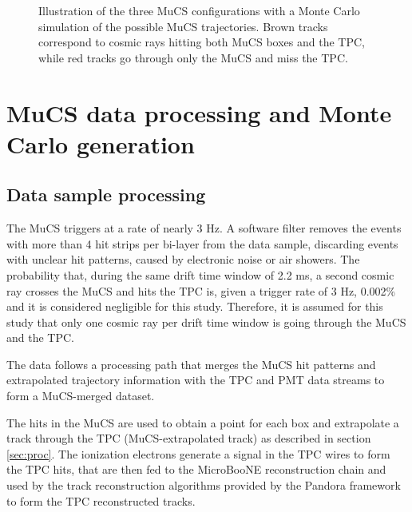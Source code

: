 \documentclass[a4paper,11pt]{article}
\begin{document}
\begin{figure}[htbp]
  \caption{Illustration of the three MuCS configurations with a Monte Carlo simulation of the possible MuCS trajectories. Brown tracks correspond to cosmic rays hitting both MuCS boxes and the TPC, while red tracks go through only the MuCS and miss the TPC.} \label{fig:mucs}
\end{figure}


\section{MuCS data processing and Monte Carlo generation}\label{sec:merging}

\subsection{Data sample processing}\label{sec:data_proc}
The MuCS triggers at a rate of nearly 3 Hz.
A software filter removes the events with more than 4 hit strips per bi-layer from the data sample, discarding events with unclear hit patterns, caused by electronic noise or air showers.
The probability that, during the same drift time window of 2.2 ms, a second cosmic ray crosses the MuCS and hits the TPC is, given a trigger rate of 3 Hz, 0.002\% and it is considered negligible for this study. Therefore, it is assumed for this study that only one cosmic ray per drift time window is going through the MuCS and the TPC.

The data follows a processing path that merges the MuCS hit patterns and extrapolated trajectory information with the TPC and PMT data streams to form a MuCS-merged dataset. %


The hits in the MuCS are used to obtain a point for each box and extrapolate a track through the TPC (MuCS-extrapolated track) as described in section \ref{sec:proc}. The ionization electrons generate a signal in the TPC wires to form the TPC hits, that are then fed to the MicroBooNE reconstruction chain and used by the track reconstruction algorithms provided by the Pandora framework \cite{pandora} to form the TPC reconstructed tracks.
\end{document}
